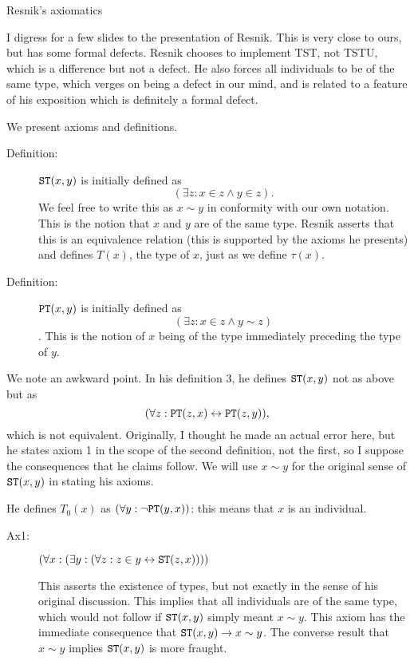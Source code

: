 \documentclass{slides}
\begin{document}
\begin{slide}

{\Large Resnik's axiomatics}

I digress for a few slides to the presentation of Resnik.  This is very close to ours, but has some formal defects.  Resnik chooses to implement TST, not TSTU, which is a difference but not a defect.  He also forces all individuals to be of the same type, which verges on being a defect in our mind, and is related to a feature of his exposition which is definitely a formal defect.

We present axioms and definitions.

\begin{description}


\item[Definition:]  ${\tt ST}(x,y)$ is initially defined as $$(\exists z:x \in z \wedge y \in z).$$  We feel free to write this as $x \sim y$ in conformity with our own notation.  This is the notion that $x$ and $y$ are of the same type.  Resnik asserts that
this is an equivalence relation (this is supported by the axioms he presents) and defines $T(x)$, the type of $x$, just as we define $\tau(x)$.

\item[Definition:]  ${\tt PT}(x,y)$ is initially defined as $$(\exists z:x \in z \wedge y \sim z)$$.  This is the notion of $x$ being of the type immediately preceding the type of $y$.

\end{description}

We note an awkward point.   In his definition 3, he defines ${\tt ST}(x,y)$ not as above but as $$(\forall z:{\tt PT}(z,x) \leftrightarrow {\tt PT}(z,y)),$$ which is not equivalent.  Originally,
I thought he made an actual error here, but he states axiom 1 in the scope of the second definition, not the first, so I suppose the consequences that he claims follow.  We will use
$x \sim y$ for the original sense of ${\tt ST}(x,y)$ in stating his axioms.

He defines $T_0(x)$ as $(\forall y:\neg {\tt PT}(y,x))$:  this means that $x$ is an individual.

\begin{description}

\item[Ax1:]   $(\forall x:(\exists y:(\forall z:z \in y \leftrightarrow {\tt ST}(z,x))))$

This asserts the existence of types, but not exactly in the sense of his original discussion.  This implies that all individuals are of the same type, which would not follow if ${\tt ST}(x,y)$ simply meant $x \sim y$.  This
axiom has the immediate consequence that ${\tt ST}(x,y) \rightarrow x \sim y$.    The converse result that $x \sim y$ implies ${\tt ST}(x,y)$ is more fraught.


\end{description}
\end{slide}
\end{document}
